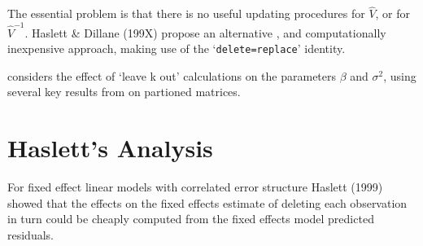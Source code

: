 \documentclass[Main.tex]{subfiles}
\begin{document}
The essential problem is that there is no
useful updating procedures for $\hat{V}$, or for $\hat{V}^{-1}$.
Haslett \& Dillane (199X) propose an alternative , and
computationally inexpensive approach, making use of the
`\texttt{delete=replace}' identity.

\citet{Haslett99} considers the effect of `leave k out'
calculations on the parameters $\beta$ and $\sigma^{2}$, using
several key results from \citet{HaslettHayes} on partioned
matrices.



\newpage
\section{Haslett's Analysis} %
For fixed effect linear models with correlated error structure Haslett (1999) showed that the effects on
the fixed effects estimate of deleting each observation in turn could be cheaply computed from the fixed effects model predicted residuals.

\end{document}
